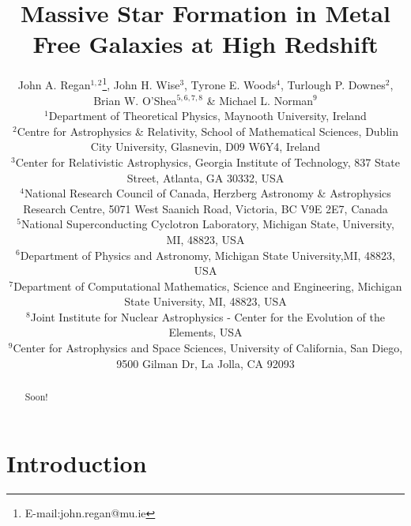 \documentclass[graphics, twocolumn, usenatbib]{mn2e}
\begin{document}
\title{Massive Star Formation in Metal Free Galaxies at High Redshift}
\author[J. A. Regan, J. H. Wise,  T. E. Woods, T.P. Downes, B.W. O'Shea \&  M.L. Norman]{John A. Regan$^{1,2}$\thanks{E-mail:john.regan@mu.ie},
  John H. Wise$^{3}$, Tyrone E. Woods$^{4}$, Turlough P. Downes$^{2}$, \newauthor Brian W. O'Shea$^{5,6,7,8}$ \& Michael L. Norman$^9$\\
  $^1$Department of Theoretical Physics, Maynooth University, Ireland\\
  $^2$Centre for Astrophysics \& Relativity, School of Mathematical Sciences, Dublin City University, Glasnevin, D09 W6Y4, Ireland\\
  $^3$Center for Relativistic Astrophysics, Georgia Institute of Technology, 837 State Street, Atlanta, GA 30332, USA\\
  $^4$National Research Council of Canada, Herzberg Astronomy \& Astrophysics Research Centre, 5071 West Saanich Road, Victoria, BC V9E 2E7, Canada\\
  $^5$National Superconducting Cyclotron Laboratory, Michigan State, University, MI, 48823, USA\\
  $^6$Department of Physics and Astronomy, Michigan State University,MI, 48823, USA\\
  $^7$Department of Computational Mathematics, Science and Engineering, Michigan State University, MI, 48823, USA\\    
  $^8$Joint Institute for Nuclear Astrophysics - Center for the Evolution of the Elements, USA\\
  $^9$Center for Astrophysics and Space Sciences, University of California, San Diego, 9500 Gilman Dr, La Jolla, CA 92093\\}

\label{firstpage}
\pagerange{\pageref{firstpage}--\pageref{lastpage}}
\maketitle

\begin{abstract}
Soon!
\end{abstract}
\section{Introduction} \label{Sec:Introduction}
\end{document}
